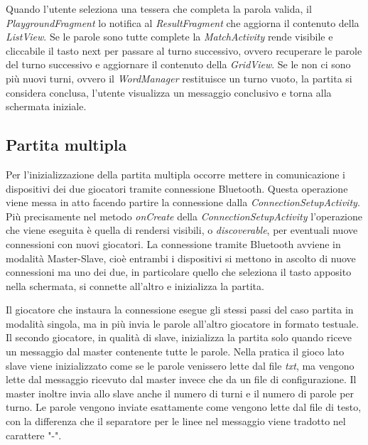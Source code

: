 

Quando l'utente seleziona una tessera che completa la parola valida, il \emph{PlaygroundFragment} lo notifica al \emph{ResultFragment} che aggiorna il contenuto della \emph{ListView}. Se le parole sono tutte complete la \emph{MatchActivity} rende visibile e cliccabile il tasto next per passare al turno successivo, ovvero recuperare le parole del turno successivo e aggiornare il contenuto della \emph{GridView}. Se le non ci sono più nuovi turni, ovvero il \emph{WordManager} restituisce un turno vuoto, la partita si considera conclusa, l'utente visualizza un messaggio conclusivo e torna alla schermata iniziale.

\subsection{Partita multipla}
Per l'inizializzazione della partita multipla occorre mettere in comunicazione i dispositivi dei due giocatori tramite connessione Bluetooth. Questa operazione viene messa in atto facendo partire la connessione dalla \emph{ConnectionSetupActivity}. Più precisamente nel metodo \emph{onCreate} della \emph{ConnectionSetupActivity} l'operazione che viene eseguita è quella di rendersi visibili, o \emph{discoverable}, per eventuali nuove connessioni con nuovi giocatori. La connessione tramite Bluetooth avviene in modalità Master-Slave, cioè entrambi i dispositivi si mettono in ascolto di nuove connessioni ma uno dei due, in particolare quello che seleziona il tasto apposito nella schermata, si connette all'altro e inizializza la partita.

Il giocatore che instaura la connessione esegue gli stessi passi del caso partita in modalità singola, ma in più invia le parole all'altro giocatore in formato testuale. Il secondo giocatore, in qualità di slave, inizializza la partita solo quando riceve un messaggio dal master contenente tutte le parole. Nella pratica il gioco lato slave viene inizializzato come se le parole venissero lette dal file \emph{txt}, ma vengono lette dal messaggio ricevuto dal master invece che da un file di configurazione. Il master inoltre invia allo slave anche il numero di turni e il numero di parole per turno. Le parole vengono inviate esattamente come vengono lette dal file di testo, con la differenza che il separatore per le linee nel messaggio viene tradotto nel carattere "-".

